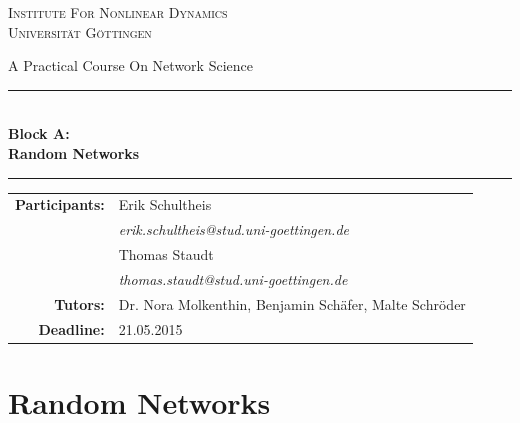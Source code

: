 \documentclass{scrartcl}
\begin{document}
\begin{titlepage}\centering
\textsc{\Large Institute For Nonlinear Dynamics \\[1.5ex] Universität Göttingen}

\vspace*{2cm}
{\huge A Practical Course On Network Science}
\vspace*{2cm}

\rule{\textwidth}{1pt}\\[0.5cm]
{\bfseries \huge Block A: \\[0.5cm] \huge \bfseries Random Networks\\[0.5cm]}
\rule{\textwidth}{1pt}

\vspace*{4cm}

\begin{Large}\begin{tabular}{rl}
        \textbf{Participants:}  & Erik Schultheis                                \\    
                   & \textit{erik.schultheis@stud.uni-goettingen.de}\\[0.5cm]
                   & Thomas Staudt                                  \\
                   & \textit{thomas.staudt@stud.uni-goettingen.de}  \\[1.0cm]

       \textbf{Tutors:}        & Dr. Nora Molkenthin, Benjamin Schäfer, Malte Schröder  \\[1.0cm]
       \textbf{Deadline:}      & 21.05.2015
\end{tabular}\end{Large}

\vspace*{1.5cm}


\end{titlepage}

\tableofcontents
\clearpage

\section{Random Networks}
\end{document}
